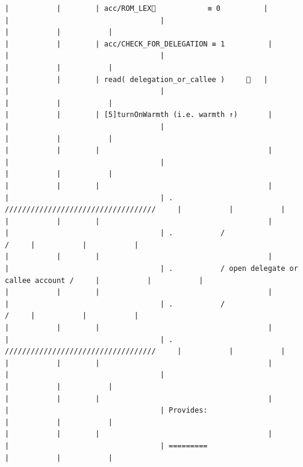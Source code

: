 \documentclass[varwidth=\maxdimen,margin=0.5cm,multi={verbatim}]{standalone}
\begin{document}
\begin{verbatim}
|           |        | acc/ROM_LEX🚩            ≡ 0          |                                 |                                   |                                                     |           |           |
|           |        | acc/CHECK_FOR_DELEGATION ≡ 1          |                                 |                                   |                                                     |           |           |
|           |        | read( delegation_or_callee )     👋   |                                 |                                   |                                                     |           |           |
|           |        | [5]turnOnWarmth (i.e. warmth ↑)       |                                 |                                   |                                                     |           |           |
|           |        |                                       |                                 |                                   |                                                     |           |           |
|           |        |                                       |                                 |                                   | .           ///////////////////////////////////     |           |           |
|           |        |                                       |                                 |                                   | .           /                                 /     |           |           |
|           |        |                                       |                                 |                                   | .           / open delegate or callee account /     |           |           |
|           |        |                                       |                                 |                                   | .           /                                 /     |           |           |
|           |        |                                       |                                 |                                   | .           ///////////////////////////////////     |           |           |
|           |        |                                       |                                 |                                   |                                                     |           |           |
|           |        |                                       |                                 |                                   | Provides:                                           |           |           |
|           |        |                                       |                                 |                                   | =========                                           |           |           |

\end{verbatim}
\end{document}
